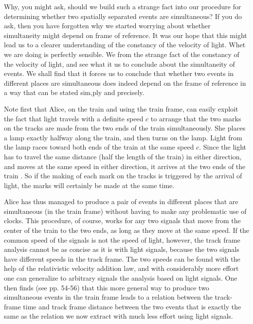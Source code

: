 Why, you might ask, should we build such a strange fact into our procedure for determining whether two spatially separated events are simultaneous? If you do ask, then you have forgotten why we started worrying about whether simultaneity might depend on frame of reference. It was our hope that this might lead us to a clearer understanding of the constancy of the velocity of light. Whet we are doing is perfectly sensible. We  from the strange fact of the constancy of the velocity of light, and see what it  us to conclude about the simultaneity of events. We shall find that it forces us to conclude that whether two events in different places are simultaneous does indeed depend on the frame of reference in a way that can be stated sim,ply and precisely.

Note first that Alice, on the train and using the train frame, can easily exploit the fact that light travels with a definite speed $c$ to arrange that the two marks on the tracks are made from the two ends of the train simultaneously. She places a lamp exactly halfway along the train, and then turns on the lamp. Light from the lamp races toward both ends of the train at the same speed $c$. Since the light has to travel the same distance (half the length of the train) in either direction, and moves at the same speed in either direction, it arrives at the two ends of the train . So if the making of each mark on the tracks is triggered by the arrival of light, the marks will certainly be made at the same time. 

Alice has thus managed to produce a pair of events in different places that are simultaneous (in the train frame) without having to make any problematic use of clocks. This procedure, of course, works for any two signals that move from the center of the train to the two ends, as long as they move at the same speed. If the common speed of the signals is not the speed of light, however, the track frame analysis cannot be as concise as it is with light signals, because the two signals have different speeds in the track frame. The two speeds can be found with the help of the relativistic velocity addition law, and with considerably more effort one can generalize to arbitrary signals the analysis based on light signals. One then finds (see pp. 54-56) that this more general way to produce two simultaneous events in the train frame leads to a relation between the track-frame time and track frame distance between the two events that is exactly the same as the relation we now extract with much less effort using light signals. 

